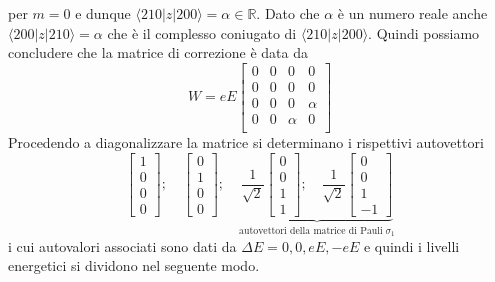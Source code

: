per $m = 0$ e dunque $\langle 210 |z|200 \rangle  = \alpha \in \mathbb{R}$. Dato che $\alpha$ \`e un numero reale anche $\langle 200| z |210 \rangle = \alpha$ che \`e il complesso coniugato di $\langle 210|z|200\rangle  $. Quindi possiamo concludere che la matrice di correzione \`e data da 
\begin{equation*}
	W = eE\left [ \begin{array}{cccc}
		0 & 0 & 0 & 0 \\
		0 & 0 & 0 & 0 \\ 
		0 & 0 & 0 & \alpha \\ 
		0 & 0 & \alpha & 0 \\
	\end{array} \right]
\end{equation*}
Procedendo a diagonalizzare la matrice si determinano i rispettivi autovettori
\begin{equation*}
	\left [ \begin{array}{c}
		1 \\ 0 \\ 0 \\ 0
	\end{array}\right ]
	;\quad 
		\left [ \begin{array}{c}
		0 \\ 1 \\ 0 \\ 0
	\end{array}\right ]
	;\quad 
	\underbrace{\frac{1}{\sqrt{2}}	\left [ \begin{array}{c}
		0 \\ 0 \\ 1 \\ 1
	\end{array}\right ]
	;\quad \frac{1}{\sqrt{2}}
		\left [ \begin{array}{c}
		0 \\ 0 \\ 1 \\ -1
	\end{array}\right ]}_{\text{autovettori della matrice di Pauli}\; \sigma_1}
\end{equation*}
i cui autovalori associati sono dati da $\Delta E = 0,0,eE,-eE$ e quindi i livelli energetici si dividono nel seguente modo.
\vspace{0.5cm}
